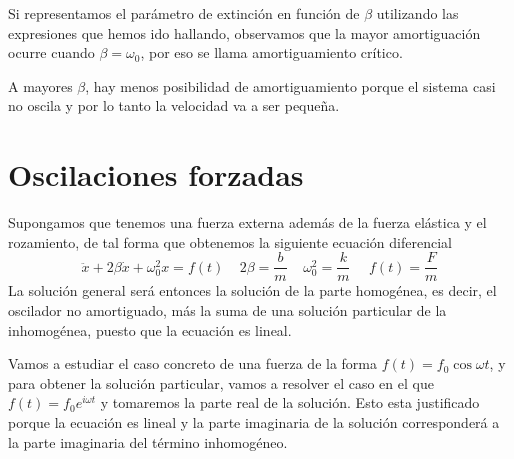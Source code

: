 Si representamos el parámetro de extinción en función de $\beta$ utilizando las expresiones que hemos ido hallando, observamos que la mayor amortiguación ocurre cuando $\beta = \omega_0$, por eso se llama amortiguamiento crítico.

A mayores $\beta$, hay menos posibilidad de amortiguamiento porque el sistema casi no oscila y por lo tanto la velocidad va a ser pequeña.

\section{Oscilaciones forzadas}

Supongamos que tenemos una fuerza externa además de la fuerza elástica y el rozamiento, de tal forma que obtenemos la siguiente ecuación diferencial
\begin{equation} \label{6.1.1}
    \ddot{x} + 2\beta\dot{x} + \omega_0^2 x = f(t) \ \ \ \ \ 2\beta = \frac{b}{m} \ \ \ \ \ \omega_0^2 = \frac{k}{m}  \ \ \ \ \ \ f(t) = \frac{F}{m}
\end{equation}
La solución general será entonces la solución de la parte homogénea, es decir, el oscilador no amortiguado, más la suma de una solución particular de la inhomogénea, puesto que la ecuación es lineal.

Vamos a estudiar el caso concreto de una fuerza de la forma $f(t) = f_0 \cos \omega t$, y para obtener la solución particular, vamos a resolver el caso en el que $f(t) = f_0 e^{i\omega t}$ y tomaremos la parte real de la solución. Esto esta justificado porque la ecuación es lineal y la parte imaginaria de la solución corresponderá a la parte imaginaria del término inhomogéneo.

